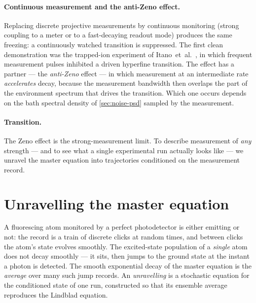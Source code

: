 \paragraph{Continuous measurement and the anti-Zeno effect.}
Replacing discrete projective measurements by continuous monitoring
(strong coupling to a meter or to a fast-decaying readout mode)
produces the same freezing: a continuously watched transition is
suppressed. The first clean demonstration was the trapped-ion
experiment of Itano~et~al.~\cite{itano1990}, in which frequent
measurement pulses inhibited a driven hyperfine transition. The
effect has a partner --- the \emph{anti-Zeno} effect --- in which
measurement at an intermediate rate \emph{accelerates} decay,
because the measurement bandwidth then overlaps the part of the
environment spectrum that drives the transition. Which one occurs
depends on the bath spectral density of \cref{sec:noise-psd}
sampled by the measurement.

\paragraph{Transition.}
The Zeno effect is the strong-measurement limit. To describe
measurement of \emph{any} strength --- and to see what a single
experimental run actually looks like --- we unravel the master
equation into trajectories conditioned on the measurement record.

\section{Unravelling the master equation}
\label{sec:unravelling}

\begin{phenomenon}
A fluorescing atom monitored by a perfect photodetector is either
emitting or not: the record is a train of discrete clicks at random
times, and between clicks the atom's state evolves smoothly. The
excited-state population of a \emph{single} atom does not decay
smoothly --- it sits, then jumps to the ground state at the instant
a photon is detected. The smooth exponential decay of the master
equation is the \emph{average} over many such jump records. An
\emph{unravelling} is a stochastic equation for the conditioned
state of one run, constructed so that its ensemble average
reproduces the Lindblad equation.
\end{phenomenon}

